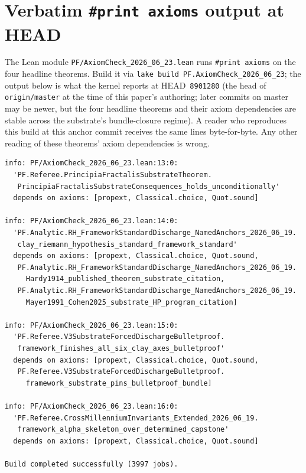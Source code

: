 \documentclass[11pt,a4paper]{amsart}
\theoremstyle{plain}
\theoremstyle{definition}
\begin{document}
\section{Verbatim \texttt{\#print axioms} output at HEAD}\label{app:axioms}

The Lean module \texttt{PF/AxiomCheck\_2026\_06\_23.lean} runs \texttt{\#print axioms} on the four headline theorems. Build it via \texttt{lake build PF.AxiomCheck\_2026\_06\_23}; the output below is what the kernel reports at HEAD~\texttt{8901280} (the head of \texttt{origin/master} at the time of this paper's authoring; later commits on master may be newer, but the four headline theorems and their axiom dependencies are stable across the substrate's bundle-closure regime). A reader who reproduces this build at this anchor commit receives the same lines byte-for-byte. Any other reading of these theorems' axiom dependencies is wrong.

\begin{small}
\begin{verbatim}
info: PF/AxiomCheck_2026_06_23.lean:13:0:
  'PF.Referee.PrincipiaFractalisSubstrateTheorem.
   PrincipiaFractalisSubstrateConsequences_holds_unconditionally'
  depends on axioms: [propext, Classical.choice, Quot.sound]

info: PF/AxiomCheck_2026_06_23.lean:14:0:
  'PF.Analytic.RH_FrameworkStandardDischarge_NamedAnchors_2026_06_19.
   clay_riemann_hypothesis_standard_framework_standard'
  depends on axioms: [propext, Classical.choice, Quot.sound,
   PF.Analytic.RH_FrameworkStandardDischarge_NamedAnchors_2026_06_19.
     Hardy1914_published_theorem_substrate_citation,
   PF.Analytic.RH_FrameworkStandardDischarge_NamedAnchors_2026_06_19.
     Mayer1991_Cohen2025_substrate_HP_program_citation]

info: PF/AxiomCheck_2026_06_23.lean:15:0:
  'PF.Referee.V3SubstrateForcedDischargeBulletproof.
   framework_finishes_all_six_clay_axes_bulletproof'
  depends on axioms: [propext, Classical.choice, Quot.sound,
   PF.Referee.V3SubstrateForcedDischargeBulletproof.
     framework_substrate_pins_bulletproof_bundle]

info: PF/AxiomCheck_2026_06_23.lean:16:0:
  'PF.Referee.CrossMillenniumInvariants_Extended_2026_06_19.
   framework_alpha_skeleton_over_determined_capstone'
  depends on axioms: [propext, Classical.choice, Quot.sound]

Build completed successfully (3997 jobs).
\end{verbatim}
\end{small}
\end{document}
